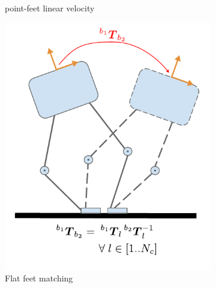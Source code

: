 \begin{figure}
\begin{subfigure}{.33\linewidth}
        \caption{point-feet linear velocity}
    \end{subfigure}%

    \bigskip
    \begin{subfigure}{.33\linewidth}
        \label{fig:kin_flat_matching}
        \centering
        \includegraphics[width=\textwidth]{figures/robot_kinematic_types_flat_matching.pdf}
        \caption{Flat feet matching}
    \end{subfigure}%
    \hfill
    \begin{subfigure}{.33\linewidth}
        \label{fig:kin_flat_direct}
        \centering

\end{subfigure}
\end{figure}
